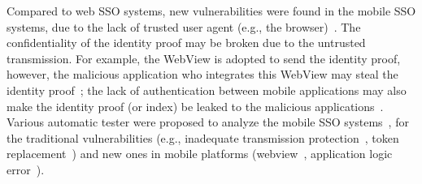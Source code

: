

Compared to web SSO systems, new vulnerabilities were found in the mobile SSO systems, due to the lack of trusted user agent (e.g., the browser)~\cite{WangZLLYLG15,WangZLLYLG15}. The confidentiality of the identity proof may be broken due to the untrusted transmission. For example, the WebView is adopted to send the identity proof, however, the malicious application who integrates this WebView may steal the identity proof~\cite{MohsenS16}; the lack of authentication  between mobile applications may also make the identity proof (or index) be leaked to the malicious applications~\cite{WangZLLYLG15}.
Various automatic tester were proposed to analyze the mobile SSO systems~\cite{MohsenS16,WangZLLYLG15,WangZLG16,YangLS17,ShiWL19}, for the traditional  vulnerabilities (e.g., inadequate transmission protection~\cite{WangZLLYLG15}, token replacement~\cite{ShiWL19}) and new ones in mobile platforms (webview~\cite{MohsenS16}, application logic error~\cite{YangLS17}).
